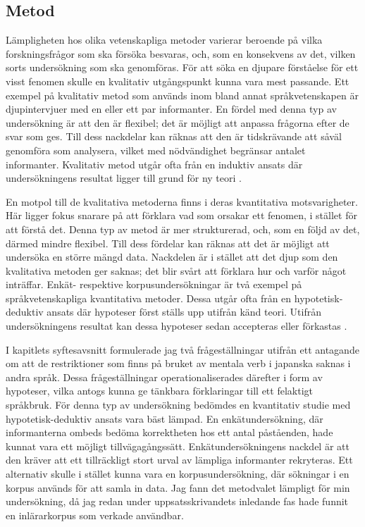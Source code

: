 \documentclass[12pt,a4paper]{article}
\begin{document}
\subsection{Metod}
\label{sec:Undersökningen: Metod}
Lämpligheten hos olika vetenskapliga metoder varierar beroende på vilka forskningsfrågor som ska försöka besvaras, och, som en konsekvens av det, vilken sorts undersökning som ska genomföras. För att söka en djupare förståelse för ett visst fenomen skulle en kvalitativ utgångspunkt kunna vara mest passande. Ett exempel på kvalitativ metod som används inom bland annat språkvetenskapen är djupintervjuer med en eller ett par informanter. En fördel med denna typ av undersökning är att den är flexibel; det är möjligt att anpassa frågorna efter de svar som ges. Till dess nackdelar kan räknas att den är tidskrävande att såväl genomföra som analysera, vilket med nödvändighet begränsar antalet informanter. Kvalitativ metod utgår ofta från en induktiv ansats där undersökningens resultat ligger till grund för ny teori \autocite{lagerholm2010,rasinger2018}.

En motpol till de kvalitativa metoderna finns i deras kvantitativa motsvarigheter. Här ligger fokus snarare på att förklara vad som orsakar ett fenomen, i stället för att förstå det. Denna typ av metod är mer strukturerad, och, som en följd av det, därmed mindre flexibel. Till dess fördelar kan räknas att det är möjligt att undersöka en större mängd data. Nackdelen är i stället att det djup som den kvalitativa metoden ger saknas; det blir svårt att förklara hur och varför något inträffar. Enkät- respektive korpusundersökningar är två exempel på språkvetenskapliga kvantitativa metoder. Dessa utgår ofta från en hypotetisk-deduktiv ansats där hypoteser först ställs upp utifrån känd teori. Utifrån undersökningens resultat kan dessa hypoteser sedan accepteras eller förkastas \autocite{lagerholm2010,rasinger2018}.

I kapitlets syftesavsnitt formulerade jag två frågeställningar utifrån ett antagande om att de restriktioner som finns på bruket av mentala verb i japanska saknas i andra språk. Dessa frågeställningar operationaliserades därefter i form av hypoteser, vilka antogs kunna ge tänkbara förklaringar till ett felaktigt språkbruk. För denna typ av undersökning bedömdes en kvantitativ studie med hypotetisk-deduktiv ansats vara bäst lämpad. En enkätundersökning, där informanterna ombeds bedöma korrektheten hos ett antal påståenden, hade kunnat vara ett möjligt tillvägagångssätt. Enkätundersökningens nackdel är att den kräver att ett tillräckligt stort urval av lämpliga informanter rekryteras. Ett alternativ skulle i stället kunna vara en korpusundersökning, där sökningar i en korpus används för att samla in data. Jag fann det metodvalet lämpligt för min undersökning, då jag redan under uppsatsskrivandets inledande fas hade funnit en inlärarkorpus som verkade användbar.
\end{document}

